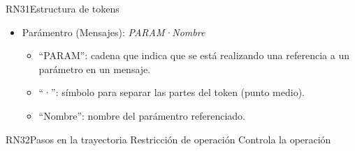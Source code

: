 \begin{BusinessRule}{RN31}{Estructura de tokens}
{\begin{itemize}
\begin{itemize}
					\item ``:'': símbolo para separar las partes del token (dos puntos).
					\item ``NombrePantalla'': nombre de la pantalla a la que pertenece la acción referenciada.
					\item ``Nombre'': nombre de la acción referenciada.				
				\end{itemize}
			\item Parámentro (Mensajes): {\it PARAM·Nombre}
				\begin{itemize}
					\item ``PARAM'': cadena que indica que se está realizando una referencia a un parámetro en un mensaje.
					\item ``·'': símbolo para separar las partes del token (punto medio).
					\item ``Nombre'': nombre del parámentro referenciado.
				\end{itemize}
	\end{itemize}		
		}
\end{BusinessRule}

\begin{BusinessRule}{RN32}{Pasos en la trayectoria}
    {Restricción de operación}
    {Controla la operación}
\end{BusinessRule}
